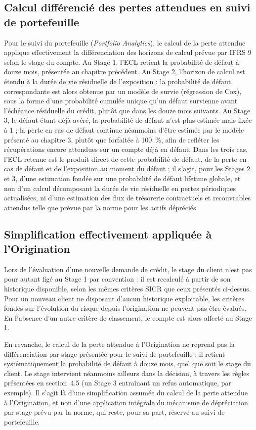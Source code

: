 \subsection{Calcul différencié des pertes attendues en suivi de portefeuille}

Pour le suivi du portefeuille (\emph{Portfolio Analytics}), le calcul de la perte attendue applique effectivement la différenciation des horizons de calcul prévue par IFRS 9 selon le stage du compte. Au Stage 1, l'ECL retient la probabilité de défaut à douze mois, présentée au chapitre précédent. Au Stage 2, l'horizon de calcul est étendu à la durée de vie résiduelle de l'exposition : la probabilité de défaut correspondante est alors obtenue par un modèle de survie (régression de Cox), sous la forme d'une probabilité cumulée unique qu'un défaut survienne avant l'échéance résiduelle du crédit, plutôt que dans les douze mois suivants. Au Stage 3, le défaut étant déjà avéré, la probabilité de défaut n'est plus estimée mais fixée à 1 ; la perte en cas de défaut continue néanmoins d'être estimée par le modèle présenté au chapitre 3, plutôt que forfaitée à 100~\%, afin de refléter les récupérations encore attendues sur un compte déjà en défaut. Dans les trois cas, l'ECL retenue est le produit direct de cette probabilité de défaut, de la perte en cas de défaut et de l'exposition au moment du défaut ; il s'agit, pour les Stages 2 et 3, d'une estimation fondée sur une probabilité de défaut lifetime globale, et non d'un calcul décomposant la durée de vie résiduelle en pertes périodiques actualisées, ni d'une estimation des flux de trésorerie contractuels et recouvrables attendus telle que prévue par la norme pour les actifs dépréciés.

\subsection{Simplification effectivement appliquée à l'Origination}

Lors de l'évaluation d'une nouvelle demande de crédit, le stage du client n'est pas pour autant figé au Stage 1 par convention : il est recalculé à partir de son historique disponible, selon les mêmes critères SICR que ceux présentés ci-dessus. Pour un nouveau client ne disposant d'aucun historique exploitable, les critères fondés sur l'évolution du risque depuis l'origination ne peuvent pas être évalués. En l'absence d'un autre critère de classement, le compte est alors affecté au Stage 1.

En revanche, le calcul de la perte attendue à l'Origination ne reprend pas la différenciation par stage présentée pour le suivi de portefeuille : il retient systématiquement la probabilité de défaut à douze mois, quel que soit le stage du client. Le stage intervient néanmoins ailleurs dans la décision, à travers les règles présentées en section~4.5 (un Stage 3 entraînant un refus automatique, par exemple). Il s'agit là d'une simplification assumée du calcul de la perte attendue à l'Origination, et non d'une application intégrale du mécanisme de dépréciation par stage prévu par la norme, qui reste, pour sa part, réservé au suivi de portefeuille.

